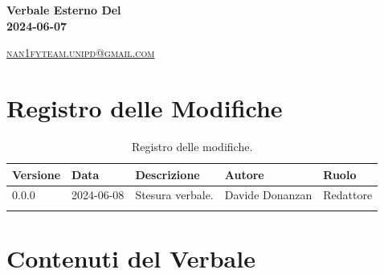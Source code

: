 \documentclass[8pt]{article}
\begin{document}
\begin{titlepage}
\begin{minipage}[t]{0.47\textwidth}
{		}
		\vspace{4mm}\vspace{4mm}
	\end{minipage}
	\vspace{4cm}
	\begin{center}
		\begin{flushright}
			{\fontsize{30pt}{52pt}\selectfont \textbf{Verbale Esterno Del\\2024-06-07\\}} %
		\end{flushright}
		\vspace{3cm}
	\end{center}
	\vspace{8.5 cm}
	{\small \textsc{\href{mailto: nan1fyteam.unipd@gmail.com}{nan1fyteam.unipd@gmail.com}}}
\end{titlepage}
\pagestyle{mystyle}

\section*{Registro delle Modifiche}
\begin{table}[ht!]	
	\centering
	\begin{tabular}{p{1.2cm} p{2cm} p{6cm} p{3cm} p{2cm}}
		\toprule
		\textbf{Versione}& \textbf{Data} & \textbf{Descrizione} & \textbf{Autore} & \textbf{Ruolo} \\
		\midrule
		0.0.0 & 2024-06-08 & Stesura verbale. & Davide Donanzan & Redattore \\\\ %
		\bottomrule
	\end{tabular}
	\caption{Registro delle modifiche.}
	\label{table:Registro delle modifiche}
\end{table}
\newpage
\tableofcontents
\clearpage
\newpage
\justifying
\section{Contenuti del Verbale}
\end{document}
